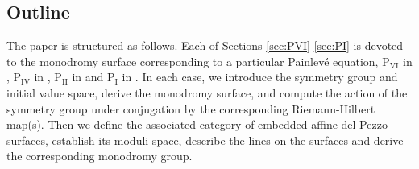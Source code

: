 \documentclass[a4paper,reqno]{amsart}
\numberwithin{equation}{section}
\newcommand\Pone{\textrm{P}_{\textrm{I}} }
\newcommand\Ptwo{\textrm{P}_{\textrm{II}} }
\newcommand\Pfour{\textrm{P}_{\textrm{IV}}}
\newcommand\Psix{\textrm{P}_{\textrm{VI}}}
\numberwithin{equation}{section}
\begin{document}
\subsection{Outline}
The paper is structured as follows. Each of Sections \ref{sec:PVI}-\ref{sec:PI} is devoted to the monodromy surface corresponding to a particular Painlev\'e equation, $\Psix$ in , $\Pfour$ in , $\Ptwo$ in  and $\Pone$ in .
In each case, we introduce the symmetry group and initial value space, derive the monodromy surface, and compute the action of the symmetry group under conjugation by the corresponding Riemann-Hilbert map(s).
Then we define the associated category of embedded affine del Pezzo surfaces, establish its moduli space, describe the lines on the surfaces and derive the corresponding monodromy group.
\end{document}
